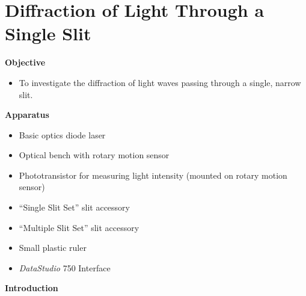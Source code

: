 
\section{Diffraction of Light Through a Single Slit}

\makelabheader %

\textbf{Objective}

\begin{itemize}
\item To investigate the diffraction of light waves passing through
a single, narrow slit. 
\end{itemize}
\textbf{Apparatus}

\begin{itemize}
\item Basic optics diode laser
\item Optical bench with rotary motion sensor
\item Phototransistor for measuring light intensity (mounted on rotary motion sensor)
\item ``Single Slit Set'' slit accessory
\item ``Multiple Slit Set'' slit accessory
\item Small plastic ruler
\item {\it DataStudio} 750 Interface
\end{itemize}
\textbf{Introduction}

